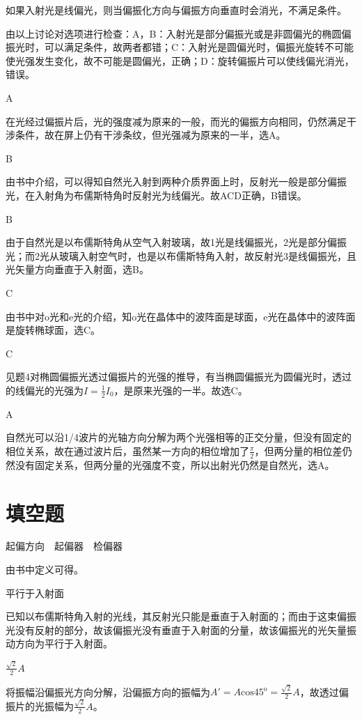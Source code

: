 如果入射光是线偏光，则当偏振化方向与偏振方向垂直时会消光，不满足条件。

由以上讨论对选项进行检查：A，B：入射光是部分偏振光或是非圆偏光的椭圆偏振光时，可以满足条件，故两者都错；C：入射光是圆偏光时，偏振光旋转不可能使光强发生变化，故不可能是圆偏光，正确；D：旋转偏振片可以使线偏光消光，错误。

\exercise A

\solve 在光经过偏振片后，光的强度减为原来的一般，而光的偏振方向相同，仍然满足干涉条件，故在屏上仍有干涉条纹，但光强减为原来的一半，选A。

\exercise B

\solve 由书中介绍，可以得知自然光入射到两种介质界面上时，反射光一般是部分偏振光，在入射角为布儒斯特角时反射光为线偏光。故ACD正确，B错误。

\exercise B

\solve 由于自然光是以布儒斯特角从空气入射玻璃，故1光是线偏振光，2光是部分偏振光；而2光从玻璃入射空气时，也是以布儒斯特角入射，故反射光3是线偏振光，且光矢量方向垂直于入射面，选B。

\exercise C

\solve 由书中对o光和e光的介绍，知o光在晶体中的波阵面是球面，e光在晶体中的波阵面是旋转椭球面，选C。

\exercise C

\solve 见题4对椭圆偏振光透过偏振片的光强的推导，有当椭圆偏振光为圆偏光时，透过的线偏光的光强为$I=\frac{1}{2}I_0$，是原来光强的一半。故选C。

\exercise A

\solve 自然光可以沿1/4波片的光轴方向分解为两个光强相等的正交分量，但没有固定的相位关系，故在通过波片后，虽然某一方向的相位增加了$\frac{\pi}{2}$，但两分量的相位差仍然没有固定关系，但两分量的光强度不变，所以出射光仍然是自然光，选A。

\section{填空题}

\exercise 起偏方向$\quad$起偏器$\quad$检偏器

\solve 由书中定义可得。

\exercise 平行于入射面

\solve 已知以布儒斯特角入射的光线，其反射光只能是垂直于入射面的；而由于这束偏振光没有反射的部分，故该偏振光没有垂直于入射面的分量，故该偏振光的光矢量振动方向为平行于入射面。

\exercise $\frac{\sqrt{2}}{2}A$

\solve 将振幅沿偏振光方向分解，沿偏振方向的振幅为$A'=A\mathrm{cos}45^{\mathrm{o}}=\frac{\sqrt{2}}{2}A$，故透过偏振片的光振幅为$\frac{\sqrt{2}}{2}A$。

